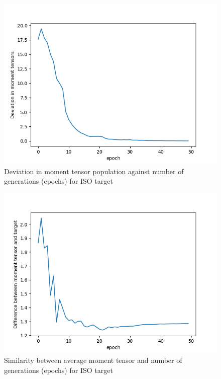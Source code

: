 \documentclass{article}
\begin{document}
\begin{figure}[H]
	\centering
	\includegraphics{dataSet2/MTDeviation.png}
	\caption{Deviation in moment tensor population against number of generations (epochs) for ISO target}
	\label{MTDISO}
\end{figure}

\begin{figure}[H]
	\centering
	\includegraphics{dataSet2/MTsimilarity.png}
	\caption{Similarity between average moment tensor and number of generations (epochs) for ISO target}
	\label{MTSISO}
\end{figure}
\end{document}
